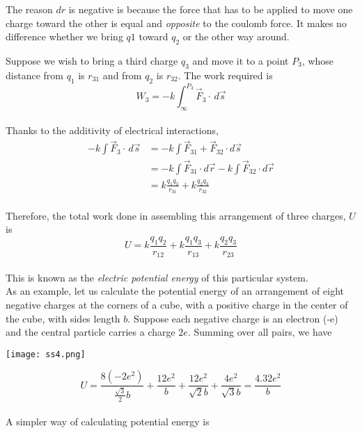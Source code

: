 \documentclass[svgnames]{article}
\begin{document}
The reason $dr$ is negative is because the force that has to be applied to move
one charge toward the other is equal and \textit{opposite} to the coulomb
force. It makes no difference whether we bring $q1$ toward $q_2$ or the other way around. 

Suppose we wish to bring a third charge $q_3$ and move it to a point $P_3$,
whose distance from $q_1$ is $r_{31}$ and from $q_2$ is $r_{32}$. The work required is \\

\[ W_3 = - k\int_\infty^{P_3} \vec{F}_3 \cdot \, d\vec{s}  \] \\

Thanks to the additivity of electrical interactions, \\ 
\begin{align*}
-k\int \vec{F}_3 \cdot \, d\vec{s} &= -k\int \vec{F}_{31} + \vec{F}_{32} \cdot d\vec{s} \\
&= -k\int \vec{F}_{31} \cdot d\vec{r} - k\int \vec{F}_{32} \cdot d\vec{r} \\ 
&= k\frac{q_1q_3}{r_{31}} + k\frac{q_2q_3}{r_{32}} 
\end{align*} \\ 

Therefore, the total work done in assembling this arrangement of three charges, $U$ is \\

\[ U = k\frac{q_1q_2}{r_{12}} + k\frac{q_1q_3}{r_{13}} +  k\frac{q_2q_3}{r_{23}} \] \\

This is known as the \textit{electric potential energy} of this particular system. \\

As an example, let us calculate the potential energy of an arrangement of eight
negative charges at the corners of a cube, with a positive charge in the center
of the cube, with sides length $b$. Suppose each negative charge is an electron
(-e) and the central particle carries a charge $2e$. Summing over all pairs, we have \\ 


\begin{center}
\texttt{[image: ss4.png]}
\end{center} 


\[ U = \frac{8 (-2e^2)}{\frac{\sqrt{3}}{2}b} + \frac{12e^2}{b}
+ \frac{12e^2}{\sqrt{2}b} + \frac{4e^2}{\sqrt{3}b} = \frac{4.32e^2}{b} \] \\

A simpler way of calculating potential energy is \\
\end{document}
